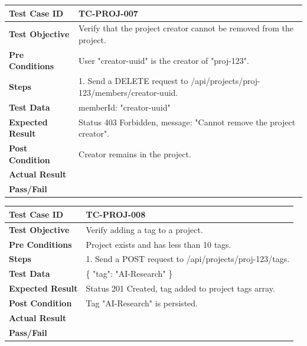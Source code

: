 \begin{longtable}{|p{}|p{}|}
\hline
\textbf{Test Case ID} & TC-PROJ-007 \\ \hline
\textbf{Test Objective} & Verify that the project creator cannot be removed from the project. \\ \hline
\textbf{Pre Conditions} & User "creator-uuid" is the creator of "proj-123". \\ \hline
\textbf{Steps} & 
1. Send a DELETE request to /api/projects/proj-123/members/creator-uuid. \\ \hline
\textbf{Test Data} & memberId: "creator-uuid" \\ \hline
\textbf{Expected Result} & Status 403 Forbidden, message: "Cannot remove the project creator". \\ \hline
\textbf{Post Condition} & Creator remains in the project. \\ \hline
\textbf{Actual Result} &  \\ \hline
\textbf{Pass/Fail} &  \\ \hline
\end{longtable}

\begin{longtable}{|p{}|p{}|}
\hline
\textbf{Test Case ID} & TC-PROJ-008 \\ \hline
\textbf{Test Objective} & Verify adding a tag to a project. \\ \hline
\textbf{Pre Conditions} & Project exists and has less than 10 tags. \\ \hline
\textbf{Steps} & 
1. Send a POST request to /api/projects/proj-123/tags. \\ \hline
\textbf{Test Data} & \{ "tag": "AI-Research" \} \\ \hline
\textbf{Expected Result} & Status 201 Created, tag added to project tags array. \\ \hline
\textbf{Post Condition} & Tag "AI-Research" is persisted. \\ \hline
\textbf{Actual Result} &  \\ \hline
\textbf{Pass/Fail} &  \\ \hline
\end{longtable}

